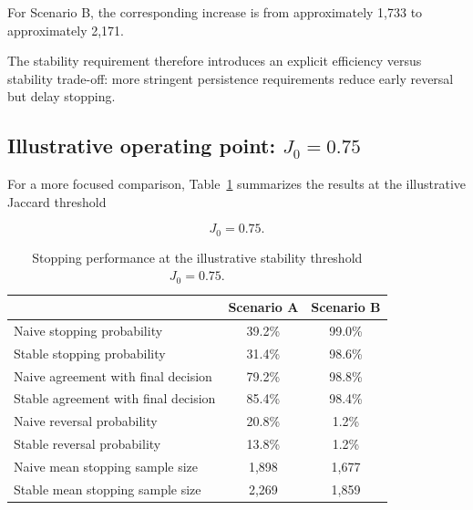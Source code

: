\documentclass[11pt,a4paper]{article}
\begin{document}
For Scenario B, the corresponding increase is from approximately 1,733 to
approximately 2,171.

The stability requirement therefore introduces an explicit efficiency versus
stability trade-off: more stringent persistence requirements reduce early
reversal but delay stopping.


\subsection{Illustrative operating point: $J_0=0.75$}

For a more focused comparison, Table~\ref{tab:main_results} summarizes the
results at the illustrative Jaccard threshold

\begin{equation}
J_0=0.75.
\end{equation}

\begin{table}[H]
\centering
\caption{
Stopping performance at the illustrative stability threshold
$J_0=0.75$.
}
\label{tab:main_results}

\begin{tabular}{lcc}
\toprule
& Scenario A & Scenario B \\
\midrule
Naive stopping probability
& 39.2\% & 99.0\% \\

Stable stopping probability
& 31.4\% & 98.6\% \\

Naive agreement with final decision
& 79.2\% & 98.8\% \\

Stable agreement with final decision
& 85.4\% & 98.4\% \\

Naive reversal probability
& 20.8\% & 1.2\% \\

Stable reversal probability
& 13.8\% & 1.2\% \\

Naive mean stopping sample size
& 1,898 & 1,677 \\

Stable mean stopping sample size
& 2,269 & 1,859 \\

\bottomrule
\end{tabular}

\end{table}
\end{document}
